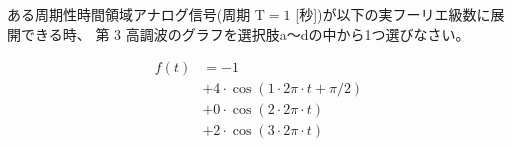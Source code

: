 ある周期性時間領域アナログ信号(周期 $\textrm{T} = 1$ [秒])が以下の実フーリエ級数に展開できる時、
第 3 高調波のグラフを選択肢a〜dの中から1つ選びなさい。

\begin{align*}
f(t) &= -1 \\
& + 4 \cdot \cos( 1 \cdot 2 \pi \cdot t + \pi/2) \\
& + 0 \cdot \cos( 2 \cdot 2 \pi \cdot t ) \\
& + 2 \cdot \cos( 3 \cdot 2 \pi \cdot t )
\end{align*}
